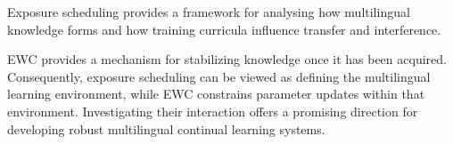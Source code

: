 Exposure scheduling provides a framework for analysing how multilingual knowledge forms and how training curricula influence transfer and interference. 

EWC provides a mechanism for stabilizing knowledge once it has been acquired. Consequently, exposure scheduling can be viewed as defining the multilingual learning environment, while EWC constrains parameter updates within that environment. Investigating their interaction offers a promising direction for developing robust multilingual continual learning systems.

